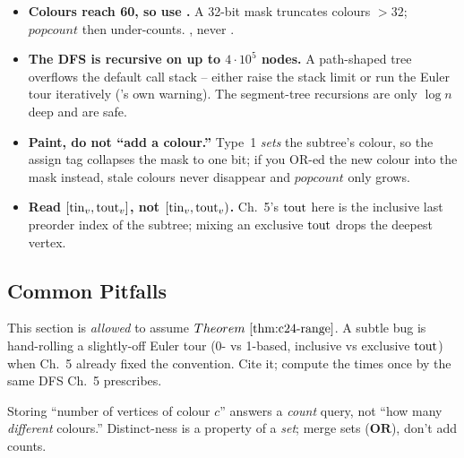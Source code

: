 \begin{hardeningbox}
\begin{itemize}[nosep,leftmargin=1.4em]
  \item \textbf{Colours reach 60, so use .}  A 32-bit  mask truncates colours \(>32\); \(\mathit{popcount}\) then under-counts.  , never .
  \item \textbf{The DFS is recursive on up to \(4\cdot10^5\) nodes.}  A path-shaped tree overflows the default call stack -- either raise the stack limit or run the Euler tour iteratively ('s own warning).  The segment-tree recursions are only \(\log n\) deep and are safe.
  \item \textbf{Paint, do not ``add a colour.''}  Type~1 \emph{sets} the subtree's colour, so the assign tag collapses the mask to one bit; if you OR-ed the new colour into the mask instead, stale colours never disappear and \(\mathit{popcount}\) only grows.
  \item \textbf{Read \([\operatorname{tin}_v,\operatorname{tout}_v]\), not \([\operatorname{tin}_v,\operatorname{tout}_v)\).}  Ch.~5's \(\operatorname{tout}\) here is the inclusive last preorder index of the subtree; mixing an exclusive \(\operatorname{tout}\) drops the deepest vertex.
\end{itemize}
\end{hardeningbox}

\subsection{Common Pitfalls}

\begin{warningbox}
This section is \emph{allowed} to assume \(\thmref{c24-range}\).  A subtle bug is hand-rolling a slightly-off Euler tour (0- vs 1-based, inclusive vs exclusive \(\operatorname{tout}\)) when Ch.~5 already fixed the convention.  Cite it; compute the times once by the same DFS Ch.~5 prescribes.
\end{warningbox}

\begin{warningbox}
Storing ``number of vertices of colour \(c\)'' answers a \emph{count} query, not ``how many \emph{different} colours.''  Distinct-ness is a property of a \emph{set}; merge sets (\(\mathbf{OR}\)), don't add counts.
\end{warningbox}

